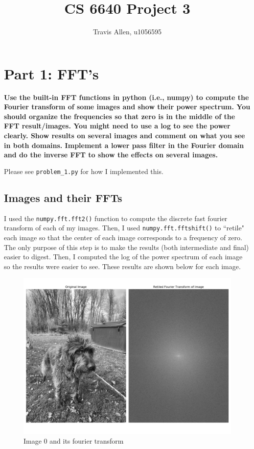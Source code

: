\documentclass[]{article}
\title{CS 6640 Project 3}
\author{Travis Allen, u1056595}
\begin{document}
	\maketitle
	
	\newpage
	\section{Part 1: FFT's}
	\textbf{Use the built-in FFT functions in python (i.e., numpy) to compute the Fourier transform of some images and show their power spectrum.  You should organize the frequencies so that zero is in the middle of the FFT result/images.  You might need to use a log to see the power clearly.   Show results on several images and comment on what you see in both domains.  Implement a lower pass filter in the Fourier domain and do the inverse FFT to show the effects on several images.}

	\vskip 10pt

	Please see \texttt{problem\_1.py} for how I implemented this. 
	
	\vskip 10pt
	
	\subsection{Images and their FFTs}
	I used the \texttt{numpy.fft.fft2()} function to compute the discrete fast fourier transform of each of my images. Then, I used \texttt{numpy.fft.fftshift()} to ``retile" each image so that the center of each image corresponds to a frequency of zero. The only purpose of this step is to make the results (both intermediate and final) easier to digest. Then, I computed the log of the power spectrum of each image so the results were easier to see. These results are shown below for each image.
		
	\begin{figure}[H]
		\centering
		\includegraphics[width=6.5in]{p1_output/img_0_ft_compare.png}
		\caption{Image 0 and its fourier transform}
	\end{figure}
	
\end{document}
